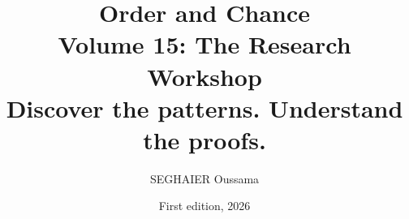 \documentclass[11pt,openany]{book}
\title{\Huge\textbf{Order and Chance}\\[0.4em]\LARGE Volume 15: The Research Workshop\\[0.6em]
\Large Discover the patterns. Understand the proofs.}
\author{SEGHAIER Oussama}
\date{First edition, 2026}
\begin{document}
\frontmatter
\makecover
\maketitle

\tableofcontents

\mainmatter














\appendix












\end{document}
